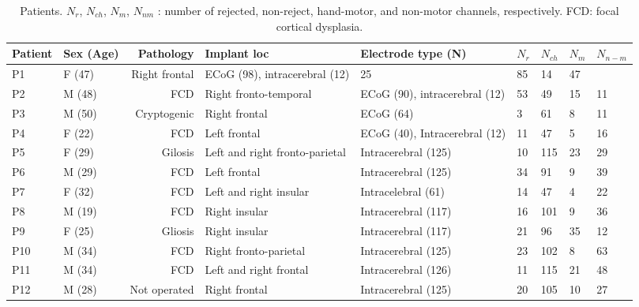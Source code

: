 \begin{table}
\centering
\begin{tabular}{llrl}
\toprule
Patient & Sex (Age) & Pathology & Implant loc & Electrode type (N) & $N_r$ & $N_{ch}$ & $N_{m}$ & $N_{n-m}$ \\
\midrule
P1 & F (47) & Right frontal & ECoG (98), intracerebral (12) & 25 & 85 & 14 & 47 \\
\hline
P2 & M (48) & FCD & Right fronto-temporal & ECoG (90), intracerebral (12) & 53 & 49 & 15 & 11 \\
\hline
P3 & M (50) & Cryptogenic & Right frontal & ECoG (64) & 3 & 61 & 8 & 11 \\
\hline
P4 & F (22) & FCD & Left frontal & ECoG (40), Intracerebral (12) & 11 & 47 & 5 & 16 \\
\hline
P5 & F (29) & Gilosis & Left and right fronto-parietal & Intracerebral (125) & 10 & 115 & 23 & 29 \\
\hline
P6 & M (29) & FCD & Left frontal & Intracerebral (125) & 34 & 91 & 9 & 39 \\
\hline
P7 & F (32) & FCD & Left and right insular & Intracelebral (61) & 14 & 47 & 4 & 22 \\
\hline
P8 & M (19) & FCD & Right insular & Intracerebral (117) & 16 & 101 & 9 & 36 \\
\hline
P9 & F (25) & Gliosis & Right insular & Intracerebral (117) & 21 & 96 & 35 & 12 \\
\hline
P10 & M (34) & FCD & Right fronto-parietal & Intracerebral (125) & 23 & 102 & 8 & 63 \\
\hline
P11 & M (34) & FCD & Left and right frontal & Intracerebral (126) & 11 & 115 & 21 & 48 \\
\hline
P12 & M (28) & Not operated & Right frontal & Intracerebral (125) & 20 & 105 & 10 & 27 \\
\bottomrule
\end{tabular}\label{tab:table}
\caption{Patients. $N_r$, $N_{ch}$, $N_{m}$, $N_{nm}$  : number of rejected, non-reject, hand-motor, and non-motor channels, respectively. FCD: focal cortical dysplasia.}
\label{tab:patient-table}
\end{table}


